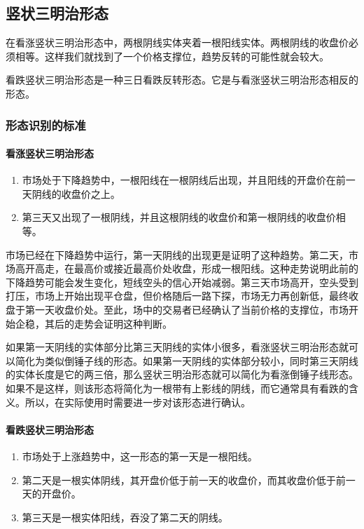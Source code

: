 \subsection{竖状三明治形态}
在看涨竖状三明治形态中，两根阴线实体夹着一根阳线实体。两根阴线的收盘价必须相等。这样我们就找到了一个价格支撑位，趋势反转的可能性就会较大。

看跌竖状三明治形态是一种三日看跌反转形态。它是与看涨竖状三明治形态相反的形态。
\subsubsection*{形态识别的标准}
\paragraph{看涨竖状三明治形态}
\begin{enumerate}
    \item 市场处于下降趋势中，一根阳线在一根阴线后出现，并且阳线的开盘价在前一天阴线的收盘价之上。
    \item 第三天又出现了一根阴线，并且这根阴线的收盘价和第一根阴线的收盘价相等。
\end{enumerate}

市场已经在下降趋势中运行，第一天阴线的出现更是证明了这种趋势。第二天，市场高开高走，在最高价或接近最高价处收盘，形成一根阳线。这种走势说明此前的下降趋势可能会发生变化，短线空头的信心开始减弱。第三天市场高开，空头受到打压，市场上开始出现平仓盘，但价格随后一路下探，市场无力再创新低，最终收盘于第一天收盘价处。至此，场中的交易者已经确认了当前价格的支撑位，市场开始企稳，其后的走势会证明这种判断。

如果第一天阴线的实体部分比第三天阴线的实体小很多，看涨竖状三明治形态就可以简化为类似倒锤子线的形态。如果第一天阴线的实体部分较小，同时第三天阴线的实体长度是它的两三倍，那么竖状三明治形态就可以简化为看涨倒锤子线形态。如果不是这样，则该形态将简化为一根带有上影线的阴线，而它通常具有看跌的含义。所以，在实际使用时需要进一步对该形态进行确认。

\paragraph{看跌竖状三明治形态}
\begin{enumerate}
    \item 市场处于上涨趋势中，这一形态的第一天是一根阳线。
    \item 第二天是一根实体阴线，其开盘价低于前一天的收盘价，而其收盘价低于前一天的开盘价。
    \item 第三天是一根实体阳线，吞没了第二天的阴线。
\end{enumerate}

